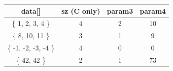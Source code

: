 \begin{enumerate}
\begin{enumerate}
    \begin{table}[h]
      \centering
      \begin{tabular}{|c|c|c|c|}
      \hline
       \textbf{data[]} & \textbf{sz} (C only)  & \textbf{param3} & \textbf{param4}  \\
       \hline 
       \{ 1, 2, 3, 4 \} & 4 & 2 & 10 \\
       \hline
       \{ 8, 10, 11 \} & 3 & 1 & 9 \\
       \hline
       \{ -1, -2, -3, -4 \} & 4 & 0 & 0 \\
       \hline
       \{ 42, 42 \} & 2 & 1 & 73 \\
       \hline
      \end{tabular}
    \end{table}
    
      \end{enumerate}
  \begin{figure}[h]
  \end{figure}
  \begin{figure}[h]
  \end{figure}

\end{enumerate}

\clearpage

